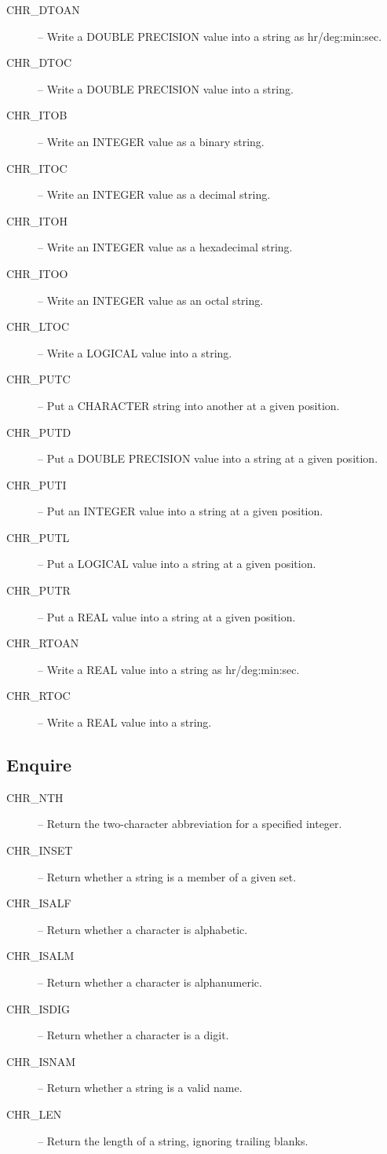 \begin{description}
\item [CHR\_DTOAN] -- Write a DOUBLE PRECISION value into a string as
hr/deg:min:sec.
\item [CHR\_DTOC] -- Write a DOUBLE PRECISION value into a string.
\item [CHR\_ITOB] -- Write an INTEGER value as a binary string.
\item [CHR\_ITOC] -- Write an INTEGER value as a decimal string.
\item [CHR\_ITOH] -- Write an INTEGER value as a hexadecimal string.
\item [CHR\_ITOO] -- Write an INTEGER value as an octal string.
\item [CHR\_LTOC] -- Write a LOGICAL value into a string.
\item [CHR\_PUTC] -- Put a CHARACTER string into another at a given position. 
\item [CHR\_PUTD] -- Put a DOUBLE PRECISION value into a string at a given position. 
\item [CHR\_PUTI] -- Put an INTEGER value into a string at a given position. 
\item [CHR\_PUTL] -- Put a LOGICAL value into a string at a given position. 
\item [CHR\_PUTR] -- Put a REAL value into a string at a given position.
\item [CHR\_RTOAN] -- Write a REAL value into a string as hr/deg:min:sec.
\item [CHR\_RTOC] -- Write a REAL value into a string.
\end {description}


\subsection {Enquire}

\begin{description}
\item [CHR\_NTH] -- Return the two-character abbreviation for a specified
integer.
\item [CHR\_INSET] -- Return whether a string is a member of a given set.
\item [CHR\_ISALF] -- Return whether a character is alphabetic.
\item [CHR\_ISALM] -- Return whether a character is alphanumeric.
\item [CHR\_ISDIG] -- Return whether a character is a digit.
\item [CHR\_ISNAM] -- Return whether a string is a valid name.
\item [CHR\_LEN] -- Return the length of a string, ignoring trailing blanks.
\end{description}


